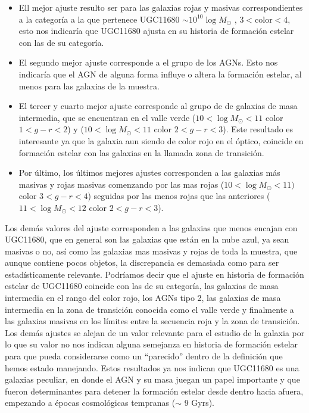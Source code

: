 \begin{itemize}

\item Ell mejor ajuste resulto ser para las galaxias rojas y masivas correspondientes a la categoría a la que pertenece UGC11680 $\sim 10^{10} \log M_{\odot}$ , $3<\text{color}<4$, esto nos indicaría que UGC11680 ajusta en su historia de formación estelar con las de su categoría.


\item  El segundo mejor ajuste corresponde a el grupo de los AGNs. Esto nos indicaría que el AGN de alguna forma influye o altera la formación estelar, al menos para las galaxias de la muestra.

\item  El tercer y cuarto mejor ajuste corresponde al grupo de  de galaxias  de masa intermedia, que se encuentran en el valle verde ($10< \log M_{\odot} < 11$ color $1<g-r<2$) y ($10< \log M_{\odot}< 11$ color $2<g-r<3$). Este resultado es interesante ya que la galaxia aun siendo de color rojo en el óptico, coincide en formación estelar con las galaxias en la llamada zona de transición.

\item Por último, los últimos mejores ajustes corresponden a las galaxias más masivas y rojas masivas  comenzando por las mas rojas ($10< \log M_{\odot}< 11)$ color $3<g-r<4$) seguidas por las menos rojas que las anteriores ($11< \log M_{\odot}< 12$ color $2<g-r<3$).


\end{itemize}

\bigskip


\noindent Los demás valores del ajuste corresponden a las galaxias que menos encajan con UGC11680, que en general son las galaxias que están en la nube azul, ya sean masivas o no, así como las galaxias mas masivas y rojas de toda la muestra, que aunque contiene pocos objetos, la discrepancia es demasiada como para ser estadísticamente relevante. Podríamos decir que el ajuste en historia de formación estelar  de UGC11680 coincide con las de su categoría, las galaxias de masa intermedia en el rango del color rojo, los AGNs tipo 2, las galaxias de masa intermedia en la zona de transición conocida como el valle verde y finalmente a las galaxias masivas en los límites entre la secuencia roja y la zona de transición. Los demás ajustes se alejan de un valor relevante para el estudio de la galaxia por lo que su valor no nos indican alguna semejanza en historia de formación estelar para que pueda considerarse como un ``parecido'' dentro de la definición que hemos estado manejando. Estos resultados ya nos indican que UGC11680 es una galaxias peculiar, en donde el AGN y su masa juegan un papel importante y que fueron determinantes para detener la formación estelar desde dentro hacia afuera, empezando a épocas cosmológicas tempranas ($\sim$ 9 Gyrs).









